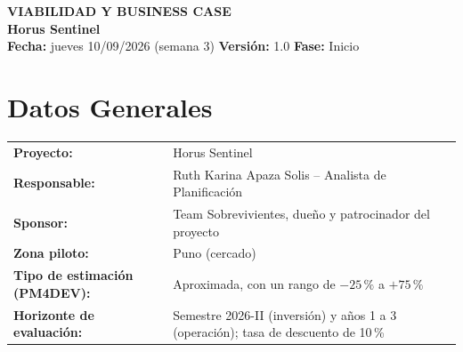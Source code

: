 \documentclass[11pt,a4paper]{article}
\begin{document}
\begin{center}
    {\Large \textbf{\textcolor{AzulUNA}{VIABILIDAD Y BUSINESS CASE}}}\\[3pt]
    {\normalsize \textbf{Horus Sentinel}}\\[4pt]
    \footnotesize \textbf{Fecha:} jueves 10/09/2026 (semana 3) \quad \textbar\quad \textbf{Versión:} 1.0 \quad \textbar\quad \textbf{Fase:} Inicio
\end{center}

\vspace{0.1cm}

\section{Datos Generales}
\noindent\begin{tabularx}{\textwidth}{@{}P{4.4cm} L@{}}
\toprule
\textbf{Proyecto:} & Horus Sentinel \\
\textbf{Responsable:} & Ruth Karina Apaza Solis -- Analista de Planificación \\
\textbf{Sponsor:} & Team Sobrevivientes, dueño y patrocinador del proyecto \\
\textbf{Zona piloto:} & Puno (cercado) \\
\textbf{Tipo de estimación (PM4DEV):} & Aproximada, con un rango de $-25\,\%$ a $+75\,\%$ \\
\textbf{Horizonte de evaluación:} & Semestre 2026-II (inversión) y años 1 a 3 (operación); tasa de descuento de 10\,\% \\
\bottomrule
\end{tabularx}
\end{document}
